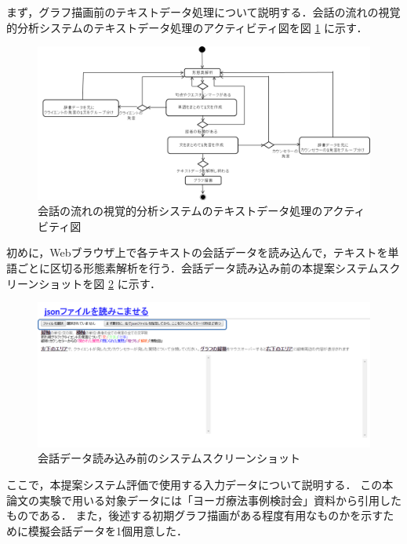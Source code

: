 \documentclass[shuuron]{kuee}
\begin{document}
まず，グラフ描画前のテキストデータ処理について説明する．会話の流れの視覚的分析システムのテキストデータ処理のアクティビティ図を図
\ref{fig:activity}
に示す．%
\begin{figure}
  \begin{center}
    \includegraphics[width=\linewidth]{activity.png}
  \end{center}
  \caption{会話の流れの視覚的分析システムのテキストデータ処理のアクティビティ図}
  \label{fig:activity}
\end{figure}


初めに，Webブラウザ上で各テキストの会話データを読み込んで，テキストを単語ごとに区切る形態素解析を行う．会話データ読み込み前の本提案システムスクリーンショットを図
\ref{fig:yomikomimae2}
に示す．
\begin{figure}
  \begin{center}
    \includegraphics[width=\linewidth]{yomikomimae2.png}
  \end{center}
  \caption{会話データ読み込み前のシステムスクリーンショット}
  \label{fig:yomikomimae2}
\end{figure}

ここで，本提案システム評価で使用する入力データについて説明する．
この本論文の実験で用いる対象データには「ヨーガ療法事例検討会」資料から引用したものである．
また，後述する初期グラフ描画がある程度有用なものかを示すために模擬会話データを1個用意した．
\end{document}
